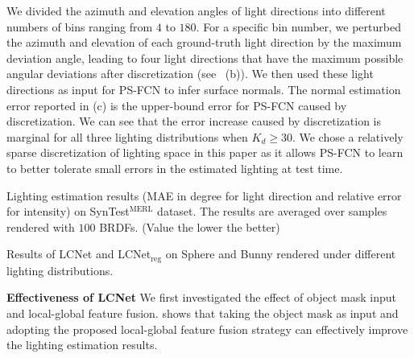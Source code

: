 \documentclass[10pt,journal,compsoc]{IEEEtran}
\newcommand{\rev}[1]{#1}
\renewcommand{\paragraph}[1]{\vspace{0.2em}\noindent \textbf{#1 \hspace{0.2em}}}
\begin{document}
We divided the azimuth and elevation angles of light directions into different numbers of bins ranging from $4$ to $180$.
For a specific bin number, we perturbed the azimuth and elevation of each ground-truth light direction by the maximum deviation angle, leading to four light directions that have the maximum possible angular deviations after discretization (see ~(b)).
We then used these light directions as input for PS-FCN to infer surface normals. The normal estimation error reported in  (c) is the upper-bound error for PS-FCN caused by discretization.
\rev{We can see that the error increase caused by discretization is marginal for all three lighting distributions when $K_d\ge30$.}
We chose a relatively sparse discretization of lighting space in this paper as it allows PS-FCN to learn to better tolerate small errors in the estimated lighting at test time.

\newcommand{\LCNetreg}{LCNet$_\text{reg}$\xspace}
\begin{table}[t] \centering
    \caption{Lighting estimation results (MAE in degree for light direction and relative error for intensity) on SynTest$^\text{MERL}$ dataset. The results are averaged over samples rendered with $100$ BRDFs. (Value the lower the better)}
     \label{tab:quant_light_synth}
\end{table}
\begin{table}[t] \centering
    \caption{Results of LCNet and \LCNetreg on {\sc Sphere} and {\sc Bunny} rendered under different lighting distributions.} \label{tab:quant_light_synth_regression}
     
\end{table}

\paragraph{Effectiveness of LCNet}
\rev{We first investigated the effect of object mask input and local-global feature fusion.
\Tref{tab:quant_light_synth} shows that taking the object mask as input and adopting the proposed local-global feature fusion strategy can effectively improve the lighting estimation results.}
\end{document}

